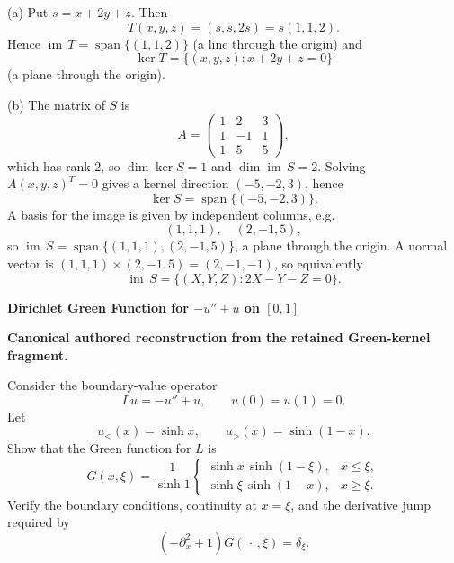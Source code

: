 \begin{solution}
(a) Put $s=x+2y+z$. Then
\[
T(x,y,z)=(s,s,2s)=s(1,1,2).
\]
Hence $\operatorname{im}\,T=\operatorname{span}\{(1,1,2)\}$ (a line through the origin) and
\[
\ker T=\{(x,y,z):x+2y+z=0\}
\]
(a plane through the origin).

(b) The matrix of $S$ is
\[
A=\begin{pmatrix}1&2&3\\ 1&-1&1\\ 1&5&5\end{pmatrix},
\]
which has rank $2$, so $\dim\ker S=1$ and $\dim\operatorname{im}\,S=2$.
Solving $A(x,y,z)^T=0$ gives a kernel direction $(-5,-2,3)$, hence
\[
\ker S=\operatorname{span}\{(-5,-2,3)\}.
\]
A basis for the image is given by independent columns, e.g.
\[
(1,1,1),\quad (2,-1,5),
\]
so $\operatorname{im}\,S=\operatorname{span}\{(1,1,1),(2,-1,5)\}$, a plane through the origin.
A normal vector is $(1,1,1)\times(2,-1,5)=(2,-1,-1)$, so equivalently
\[
\operatorname{im}\,S=\{(X,Y,Z):2X-Y-Z=0\}.
\]
\end{solution}

\begin{problem}[CP-I-0016]
\label{prob:cp-i-0016}
\textbf{Dirichlet Green Function for \(-u''+u\) on \([0,1]\)}

\textbf{Canonical authored reconstruction from the retained Green-kernel fragment.}

\hspace*{1.5em}Consider the boundary-value operator
\[
L u=-u''+u,\qquad u(0)=u(1)=0.
\]
Let
\[
u_{<}(x)=\sinh x,\qquad u_{>}(x)=\sinh(1-x).
\]
Show that the Green function for \(L\) is
\[
G(x,\xi)=\frac{1}{\sinh 1}
\begin{cases}
\sinh x\,\sinh(1-\xi),&x\le \xi,\\[2mm]
\sinh \xi\,\sinh(1-x),&x\ge \xi.
\end{cases}
\]
Verify the boundary conditions, continuity at \(x=\xi\), and the derivative jump required by
\[
(-\partial_x^2+1)G(\,\cdot\,,\xi)=\delta_\xi .
\]
\end{problem}

